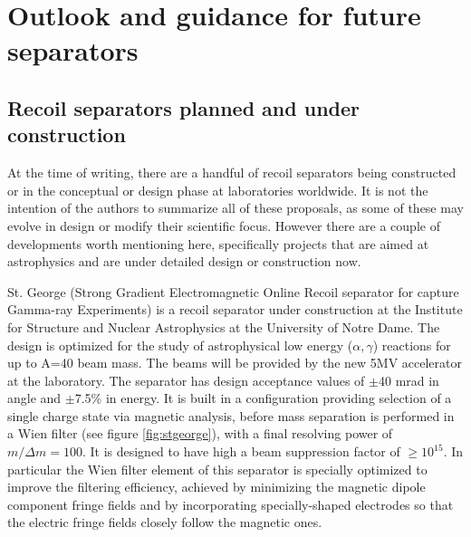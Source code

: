\section{Outlook and guidance for future separators}

\subsection{Recoil separators planned and under construction}

At the time of writing, there are a handful of recoil separators being constructed or in the conceptual or design phase at laboratories worldwide. It is not the intention of the authors to summarize all of these proposals, as some of these may evolve in design or modify their scientific focus. However there are a couple of developments worth mentioning here, specifically projects that are aimed at astrophysics and are under detailed design or construction now. 

St. George (Strong Gradient Electromagnetic Online Recoil separator for capture Gamma-ray Experiments) \cite{cou08} is a recoil separator under construction at the Institute for Structure and Nuclear Astrophysics at the University of Notre Dame. The design is optimized for the study of astrophysical low energy ($\alpha,\gamma$) reactions for up to A=40 beam mass. The beams will be provided by the new 5MV accelerator at the laboratory. The separator has design acceptance values of $\pm$40 mrad in angle and $\pm$7.5\% in energy. It is built in a configuration providing selection of a single charge state via magnetic analysis, before mass separation is performed in a Wien filter (see figure \ref{fig:stgeorge}), with a final resolving power of $m/\Delta m=100$. It is designed to have high a beam suppression factor of $\ge10^{15}$. In particular the Wien filter element of this separator is specially optimized to improve the filtering efficiency, achieved by minimizing the magnetic dipole component fringe fields and by incorporating specially-shaped electrodes so that the electric fringe fields closely follow the magnetic ones. 

